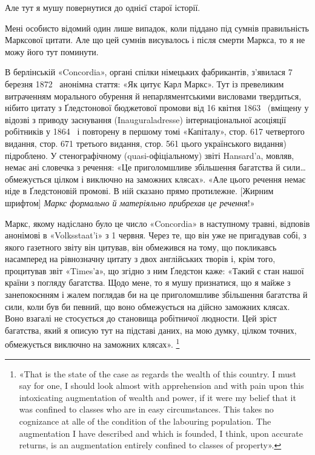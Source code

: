 Але тут я мушу повернутися до однієї старої історії.

Мені особисто відомий один лише випадок, коли піддано під
сумнів правильність Марксової цитати. Але що цей сумнів висувалось
і після смерти Маркса, то я не можу його тут поминути.

В берлінській «Concordia», органі спілки німецьких фабрикантів,
з’явилася 7 березня 1872~ анонімна стаття: «Як цитує
Карл Маркс». Тут із превеликим витраченням морального обурення
й непарляментськими висловами твердиться, нібито цитату
з Ґледстонової бюджетової промови від 16 квітня 1863~
(вміщену у відозві з приводу заснування (Inauguraladresse) інтернаціональної
асоціяції робітників у 1864~ і повторену в першому
томі «Капіталу», стор. 617 четвертого видання, стор. 671 третього
видання, стор. 561 цього українського видання) підроблено.
У стенографічному (quasi-офіціальному) звіті Hansard’a,
мовляв, немає ані словечка з речення: «Це приголомшливе збільшення
багатства й сили\dots{} обмежується цілком і виключно на
заможних клясах». «Але цього речення немає ніде в Ґледстоновій
промові. В ній сказано прямо протилежне. [Жирним
шрифтом] \emph{Маркс формально й матеріяльно прибрехав це речення}!»

Маркс, якому надіслано було це число «Concordia» в наступному
травні, відповів анонімові в «Volksstaat’i» з 1 червня. Через
те, що він уже не пригадував собі, з якого газетного звіту він цитував,
він обмежився на тому, що покликавсь насамперед на рівнозначну
цитату з двох англійських творів і, крім того, процитував
звіт «Times’а», що згідно з ним Ґледстон каже: «Такий є
стан нашої країни з погляду багатства. Щодо мене, то я мушу
признатися, що я майже з занепокоєнням і жалем поглядав би на
це приголомшливе збільшення багатства й сили, коли був би певний,
що воно обмежується на дійсно заможних клясах. Воно
взагалі не стосується до становища робітничої людности. Цей
зріст багатства, який я описую тут на підставі даних, на мою
думку, цілком точних, обмежується виключно на заможних
клясах». \footnote{«That is the state of the case as regards the wealth of this country.
I must say for one, I should look almost with apprehension and with pain
upon this intoxicating augmentation of wealth and power, if it were my
belief that it was confined to classes who are in easy circumstances. This
takes no cognizance at alle of the condition of the labouring population.
The augmentation I have described and which is founded, I think, upon
accurate returns, is an augmentation entirely confined to classes of property».}

